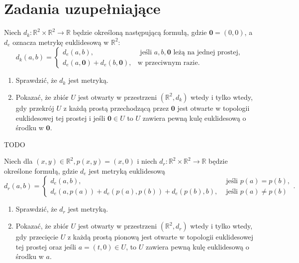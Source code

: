 \section{Zadania uzupełniające}

\begin{problem}[1.1]
	Niech $d_{k} : \mathbb{R}^2 \times \mathbb{R}^2 \to \mathbb{R} $ będzie określoną następującą formułą, gdzie $\mathbf{0} = \left( 0,0 \right) $, a $d_{e}$ oznacza metrykę euklidesową w $\mathbb{R}^2$:
	\[
	d_{k}\left( a,b \right) = 
	\begin{cases}
		d_{e}\left( a,b \right) , &\text{ jeśli } a,b,\mathbf{0}\text{ leżą na jednej prostej,} \\
		d_{e}\left(a, \mathbf{0} \right) + d_{e}\left( b, \mathbf{0} \right), &\text{w przeciwnym razie.}
	\end{cases}
	\] 
	\begin{enumerate}[label=\alph*)]
		\item Sprawdzić, że $d_{k}$ jest metryką.
		\item Pokazać, że zbiór $U$ jest otwarty w przestrzeni $\left( \mathbb{R}^2, d_{k} \right) $ wtedy i tylko wtedy, gdy przekrój $U$ z każdą prostą przechodzącą przez $\mathbf{0}$ jest otwarte w topologii euklidesowej tej prostej i jeśli $\mathbf{0} \in U$ to $U$ zawiera pewną kulę euklidesową o środku w $\mathbf{0}$.
	\end{enumerate}
\end{problem} 
\begin{solution}
	TODO
\end{solution} 
\begin{problem}[1.2]
	Niech dla $\left( x,y \right) \in \mathbb{R}^2, p\left( x,y \right) = \left( x,0 \right) $ i niech $d_{r}: \mathbb{R}^2 \times \mathbb{R}^2\to \mathbb{R}$ będzie określone formułą, gdzie $d_{e}$ jest metryką euklidesową
	\[
	d_{r}\left( a,b \right) =
	\begin{cases}
		d_{e}\left( a,b \right), &\text{ jeśli } p\left( a \right) = p\left( b \right), \\
		d_{e}\left( a, p\left( a \right)  \right) + d_{e}\left( p\left( a \right) , p\left( b \right)  \right) + d_{e}\left( p\left( b \right) , b \right), &\text{ jeśli } p\left( a \right) \neq p\left( b \right) 
	\end{cases}
	.\] 
	\begin{enumerate}[label=\arabic*)]
		\item Sprawdzić, że $d_{r}$ jest metryką.
		\item Pokazać, że zbiór $U$ jest otwarty w przestrzeni $\left( \mathbb{R}^2, d_{r} \right) $ wtedy i tylko wtedy, gdy przecięcie $U$ z każdą prostą pionową jest otwarte w topologii euklidesowej tej prostej oraz jeśli $a = \left( t,0 \right) \in U$, to $U$ zawiera pewną kulę euklidesową o środku w $a$.
	\end{enumerate}
\end{problem} 
